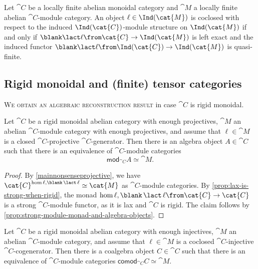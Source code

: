 \begin{proposition}
  Let \(\cat{C}\) be a locally finite abelian monoidal category
  and \(\cat{M}\) a locally finite abelian \(\cat{C}\)\hyp{}module category.
  An object \(\ell \in \Ind(\cat{M})\) is coclosed with respect to the induced \(\Ind(\cat{C})\)\hyp{}module structure on \(\Ind(\cat{M})\)
  if and only if
  \(\blank \lact \ell \from \cat{C} \to \Ind(\cat{M})\) is left exact
  and the induced functor \(\blank \lact \ell\from \Ind(\cat{C}) \to \Ind(\cat{M})\) is quasi-finite.
\end{proposition}

\subsection{Rigid monoidal and (finite) tensor categories}

\textsc{We obtain an algebraic reconstruction result}
in case \(\cat{C}\) is rigid monoidal.

\begin{theorem}\label{thm:main-result-rigid-projective-case}
  Let \(\cat{C}\) be a rigid monoidal abelian category with enough projectives,
  \(\cat{M}\) an abelian \(\cat{C}\)\hyp{}module category with enough projectives,
  and assume that \(\ell \in \cat{M}\) is a closed \(\cat{C}\)\hyp{}projective \(\cat{C}\)\hyp{}generator.
  Then there is an algebra object \(A \in \cat{C}\) such that
  there is an equivalence of \(\cat{C}\)\hyp{}module categories
  \[
    \mathsf{mod}_{\cat{C}}A \simeq \cat{M}.
  \]
\end{theorem}
\begin{proof}
  By \cref{mainnonsenseprojective},
  we have \(\cat{C}^{\hom{\ell, \blank \,\lact\, \ell}} \simeq \cat{M}\)
  as \(\cat{C}\)\hyp{}module categories.
  By \cref{prop:lax-is-strong-when-rigid},
  the monad \(\hom{\ell, \blank \,\lact\, \ell}\from \cat{C}\to \cat{C}\) is a strong \(\cat{C}\)\hyp{}module functor,
  as it is lax and \(\cat{C}\) is rigid.
  The claim follows by \cref{prop:strong-module-monad-and-algebra-objects}.
\end{proof}

\begin{theorem}\label{thm:main-result-rigid-injective-case}
  Let \(\cat{C}\) be a rigid monoidal abelian category with enough injectives,
  \(\cat{M}\) an abelian \(\cat{C}\)\hyp{}module category,
  and assume that \(\ell \in \cat{M}\) is a coclosed \(\cat{C}\)\hyp{}injective \(\cat{C}\)\hyp{}cogenerator.
  Then there is a coalgebra object \(C \in \cat{C}\) such that there is an equivalence of
  \(\cat{C}\)\hyp{}module categories \(\mathsf{comod}_{\cat{C}}C \simeq \cat{M}\).
\end{theorem}

